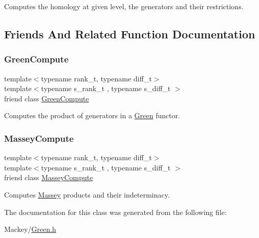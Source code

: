 Computes the homology at given level, the generators and their restrictions. 

\subsection{Friends And Related Function Documentation}
\mbox{\label{classMackey_1_1internal_1_1ChainsLevelGen_a85de7c4aeeee34981e2020c2f9ddd3e2}} 
\subsubsection{\texorpdfstring{Green\+Compute}{GreenCompute}}
{\footnotesize\ttfamily template$<$typename rank\+\_\+t, typename diff\+\_\+t$>$ \\
template$<$typename s\+\_\+rank\+\_\+t , typename s\+\_\+diff\+\_\+t $>$ \\
friend class \hyperlink{classMackey_1_1internal_1_1GreenCompute}{Green\+Compute}\hspace{0.3cm}{\ttfamily [friend]}}



Computes the product of generators in a \hyperlink{classMackey_1_1Green}{Green} functor. 

\mbox{\label{classMackey_1_1internal_1_1ChainsLevelGen_af259bfb9b4dced17104ac8fbb697355c}} 
\subsubsection{\texorpdfstring{Massey\+Compute}{MasseyCompute}}
{\footnotesize\ttfamily template$<$typename rank\+\_\+t, typename diff\+\_\+t$>$ \\
template$<$typename s\+\_\+rank\+\_\+t , typename s\+\_\+diff\+\_\+t $>$ \\
friend class \hyperlink{structMackey_1_1internal_1_1MasseyCompute}{Massey\+Compute}\hspace{0.3cm}{\ttfamily [friend]}}



Computes \hyperlink{classMackey_1_1Massey}{Massey} products and their indeterminacy. 



The documentation for this class was generated from the following file\+:\begin{DoxyCompactItemize}
\item 
Mackey/\hyperlink{Green_8h}{Green.\+h}\end{DoxyCompactItemize}

